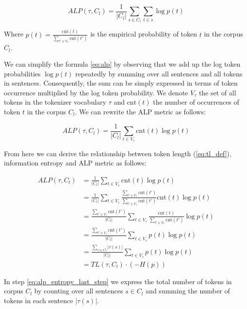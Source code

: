 \begin{equation}
\label{eq:alp}
    ALP(\tau, C_l) = \frac{1}{|C_l|} \sum_{s \in C_l} \sum_{t \in s} \log p(t)
\end{equation}

Where $p(t) = \frac{\mathrm{cnt}(t)}{\sum_{t' \in V_\tau} \mathrm{cnt}(t')}$ is the empirical probability of token $t$ in the corpus $C_l$. 


We can simplify the formula \autoref{eq:alp} by observing that we add up the log token probabilities $\log p(t)$ repeatedly by summing over all sentences and all tokens in sentences. Consequently, the sum can be simply expressed in terms of token occurrence multiplied by the log token probability. We denote $V_\tau$ the set of all tokens in the tokenizer vocabulary $\tau$ and $\mathrm{cnt}(t)$ the number of occurrences of token $t$ in the corpus $C_l$. We can rewrite the ALP metric as follows:

\begin{equation}
    ALP(\tau, C_l) = \frac{1}{|C_l|} \sum_{t \in V_\tau} \mathrm{cnt}(t) \log p(t)
\end{equation}

From here we can derive the relationship between token length (\autoref{eq:tl_def}), information entropy and ALP metric as follows:

\begin{align}
ALP(\tau, C_l) &= \frac{1}{|C_l|} \sum_{t \in V_\tau} \mathrm{cnt}(t) \log p(t) \\
&= \frac{1}{|C_l|} \sum_{t \in V_\tau} \frac{\sum_{t' \in V_\tau} \mathrm{cnt}(t')}{\sum_{t' \in V_\tau} \mathrm{cnt}(t')} \mathrm{cnt}(t) \log p(t) \\
&= \frac{\sum_{t' \in V_\tau} \mathrm{cnt}(t')}{|C_l|} \sum_{t \in V_\tau} \frac{\mathrm{cnt}(t)}{\sum_{t' \in V_\tau} \mathrm{cnt}(t')} \log p(t) \\
&= \frac{\sum_{t' \in V_\tau} \mathrm{cnt}(t')}{|C_l|} \sum_{t \in V_\tau} p(t) \log p(t) \\
&= \frac{\sum_{s \in C_l}|\tau(s)|}{|C_l|} \sum_{t \in V_\tau} p(t) \log p(t) \label{eq:alp_entropy_last_step}\\
&= TL(\tau, C_l) \cdot (- H(p))
\end{align}

In step \ref{eq:alp_entropy_last_step} we express the total number of tokens in corpus $C_l$ by counting over all sentences $s \in C_l$ and summing the number of tokens in each sentence $|\tau(s)|$.

